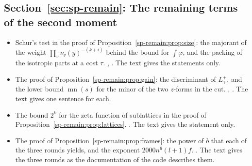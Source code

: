 \subsection*{Section~\ref{sec:sp-remain}: The remaining terms of the second moment}
\begin{itemize}[leftmargin=2em,itemsep=1pt]
\item Schur's test in the proof of Proposition~\ref{sp-remain:prop:size}: the majorant of the weight
  $\prod_v\nu_v(y)^{-(k+i)}$ behind the bound for $\int\varphi$, and the packing of the isotropic
  parts at a cost $\tau$. ,
  . The text gives the statements only.
\item The proof of Proposition~\ref{sp-remain:prop:gain}: the discriminant of $L^+_\gamma$, and the
  lower bound $\operatorname{mn}(s)$ for the minor of the two $z$-forms in the cut.
  ,
  . The text gives one sentence
  for each.
\item The bound $2^k$ for the zeta function of sublattices in the proof of
  Proposition~\ref{sp-remain:prop:lattices}. . The
  text gives the statement only.
\item The proof of Proposition~\ref{sp-remain:prop:frames}: the power of $b$ that each of the three
  rounds yields, and the exponent $2000n^6(l+1)f$.
  . The text gives the three rounds as the
  documentation of the code describes them.
\end{itemize}

